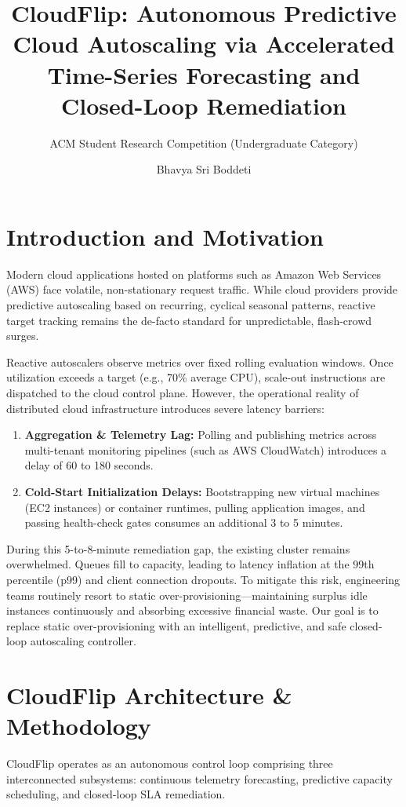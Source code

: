 \documentclass[sigconf,nonacm]{acmart}
\title{CloudFlip: Autonomous Predictive Cloud Autoscaling via Accelerated Time-Series Forecasting and Closed-Loop Remediation}
\subtitle{ACM Student Research Competition (Undergraduate Category)}
\author{Bhavya Sri Boddeti}
\affiliation{%
  \institution{Department of Computer Science, St. Ann's College for Women (Autonomous)}
  \city{Visakhapatnam}
  \state{Andhra Pradesh}
  \country{India}
}
\begin{document}
\maketitle

\section{Introduction and Motivation}
Modern cloud applications hosted on platforms such as Amazon Web Services (AWS) face volatile, non-stationary request traffic. While cloud providers provide predictive autoscaling based on recurring, cyclical seasonal patterns, reactive target tracking remains the de-facto standard for unpredictable, flash-crowd surges. 

Reactive autoscalers observe metrics over fixed rolling evaluation windows. Once utilization exceeds a target (e.g., 70\% average CPU), scale-out instructions are dispatched to the cloud control plane. However, the operational reality of distributed cloud infrastructure introduces severe latency barriers:
\begin{enumerate}
    \item \textbf{Aggregation & Telemetry Lag:} Polling and publishing metrics across multi-tenant monitoring pipelines (such as AWS CloudWatch) introduces a delay of 60 to 180 seconds.
    \item \textbf{Cold-Start Initialization Delays:} Bootstrapping new virtual machines (EC2 instances) or container runtimes, pulling application images, and passing health-check gates consumes an additional 3 to 5 minutes.
\end{enumerate}

During this 5-to-8-minute remediation gap, the existing cluster remains overwhelmed. Queues fill to capacity, leading to latency inflation at the 99th percentile (p99) and client connection dropouts. To mitigate this risk, engineering teams routinely resort to static over-provisioning—maintaining surplus idle instances continuously and absorbing excessive financial waste. Our goal is to replace static over-provisioning with an intelligent, predictive, and safe closed-loop autoscaling controller.

\section{CloudFlip Architecture & Methodology}
CloudFlip operates as an autonomous control loop comprising three interconnected subsystems: continuous telemetry forecasting, predictive capacity scheduling, and closed-loop SLA remediation.
\end{document}
